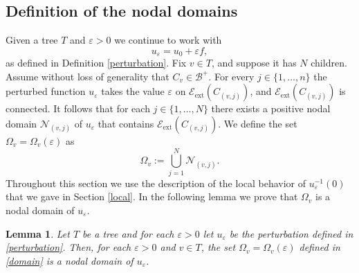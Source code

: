 \documentclass[11pt,reqno]{amsart}
\newcommand{\ep}{\varepsilon}
\newtheorem{lemma}[theorem]{Lemma}
\theoremstyle{definition}
\begin{document}
\subsection{Definition of the nodal domains}
Given a tree $T$ and $\ep>0$  we continue to work with 
 \begin{equation*}
 u_\ep= u_0 +\ep f,
 \end{equation*} 
 as defined in Definition \ref{perturbation}.
 Fix $v \in T$, and suppose it has $N$ children. Assume without loss of generality that $C_v \in \mathcal B^+$.  For every $j \in \{1, \dots, n\}$ the perturbed function  $u_\ep$ takes the value  $\ep$ on $\mathcal E_{\text{ext}} (C_{(v,j)})$, and $\mathcal E_{\text{ext}} (C_{(v,j)})$ is connected.  It follows that for each $j \in\{1, \dots, N\}$ there exists a positive nodal domain $\mathcal N_{(v,j)}$  of $u_\ep$ that contains  $\mathcal E_{\text{ext}} (C_{(v,j)})$. We define the set $\Omega_{v}=\Omega_{v}(\ep)$ as 
 \begin{equation}\label{domain}
 \Omega_{v}:=\bigcup_{j=1}^N \mathcal N_{(v,j)}.
 \end{equation}
 Throughout this section we  use  the description of the local behavior of $u_\ep^{-1}(0)$ that we gave in Section \ref{local}.
In the following lemma we prove that  $\Omega_v$ is a nodal domain of $u_\ep$.

\begin{lemma}\label{nodal d}
Let $T$ be a tree and for each  $\ep>0$ let $u_\ep$ be the perturbation defined in \eqref{perturbation}.  Then, for each $\ep>0$ and $v \in T$, the set $\Omega_v=\Omega_v(\ep)$  defined in \eqref{domain} is a nodal domain of $u_\ep$.
\end{lemma}
\end{document}
